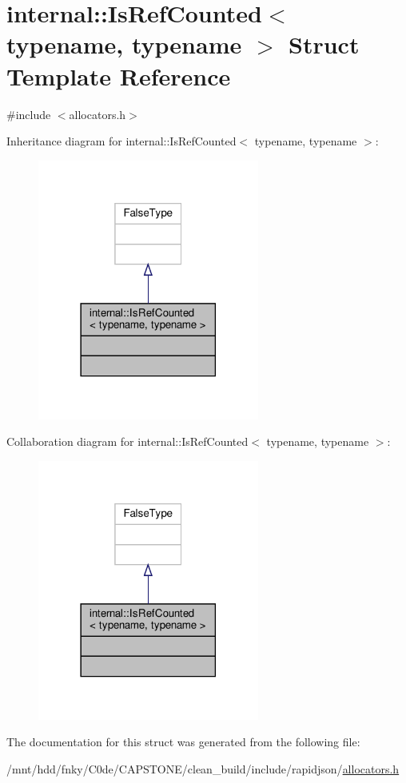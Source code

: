 \hypertarget{structinternal_1_1IsRefCounted}{}\section{internal\+:\+:Is\+Ref\+Counted$<$ typename, typename $>$ Struct Template Reference}
\label{structinternal_1_1IsRefCounted}


{\ttfamily \#include $<$allocators.\+h$>$}



Inheritance diagram for internal\+:\+:Is\+Ref\+Counted$<$ typename, typename $>$\+:
\nopagebreak
\begin{figure}[H]
\begin{center}
\leavevmode
\includegraphics[width=206pt]{structinternal_1_1IsRefCounted__inherit__graph}
\end{center}
\end{figure}


Collaboration diagram for internal\+:\+:Is\+Ref\+Counted$<$ typename, typename $>$\+:
\nopagebreak
\begin{figure}[H]
\begin{center}
\leavevmode
\includegraphics[width=206pt]{structinternal_1_1IsRefCounted__coll__graph}
\end{center}
\end{figure}


The documentation for this struct was generated from the following file\+:\begin{DoxyCompactItemize}
\item 
/mnt/hdd/fnky/\+C0de/\+C\+A\+P\+S\+T\+O\+N\+E/clean\+\_\+build/include/rapidjson/\hyperlink{allocators_8h}{allocators.\+h}\end{DoxyCompactItemize}
